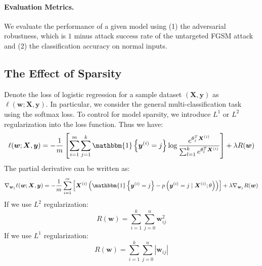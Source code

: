 \documentclass{article}
\begin{document}
\paragraph{Evaluation Metrics.} We evaluate the performance of a given model using (1) the adversarial robustness, which is $1$ minus attack success rate of the untargeted FGSM attack and (2) the classification accuracy on normal inputs. 


\subsection{The Effect of Sparsity}
Denote the loss of logistic regression for a sample dataset $(\bm{X}, \bm{y})$ as $\ell(\bm{w}; \bm{X}, \bm{y})$. In particular, we consider the general multi-classification task using the softmax loss. To control for model sparsity, we introduce $L^{1}$ or $L^{2}$ regularization into the loss function. Thus we have:
\begin{equation}
    \ell(\bm{w}; \bm{X}, \bm{y})=-\frac{1}{m}\left[\sum_{i=1}^{m} \sum_{j=1}^{k} \mathbbm{1}\left\{\bm{y}^{(i)}=j\right\} \log \frac{e^{\theta_{j}^{T} \bm{X}^{(i)}}}{\sum_{l=1}^{k} e^{\theta_{l}^{T} \bm{X}^{(i)}}}\right] + \lambda R(\bm{w})
\end{equation}
The partial derivative can be written as:
\begin{equation}
    \nabla_{\bm{w}_{j}} \ell(\bm{w}; \bm{X}, \bm{y}) = -\frac{1}{m} \sum_{i=1}^{m}\left[\bm{X}^{(i)}\left(\mathbbm{1}\left\{\bm{y}^{(i)}=j\right\}-p\left(\bm{y}^{(i)}=j \mid \bm{X}^{(i)} ; \theta\right)\right)\right]+\lambda \nabla_{\bm{w}_{j}} R(\bm{w})
\end{equation}
If we use  $L^{2}$ regularization:
\begin{equation}
    R(\bm{w}) = \sum_{i=1}^{k} \sum_{j=0}^{n} \bm{w}_{i j}^{2}
\end{equation}
If we use $L^{1}$ regularization:
\begin{equation}
    R(\bm{w}) = \sum_{i=1}^{k} \sum_{j=0}^{n} |\bm{w}_{i j}|
\end{equation}
\end{document}
